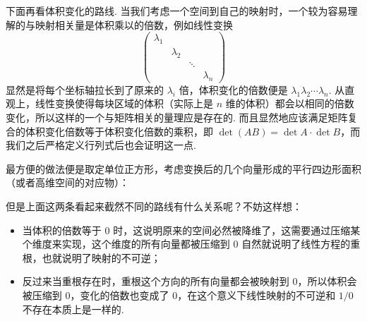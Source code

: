 下面再看体积变化的路线. 当我们考虑一个空间到自己的映射时，一个较为容易理解的与映射相关量是体积乘以的倍数，例如线性变换
$$
\begin{pmatrix}
\lambda_1 \\ & \lambda_2 \\ && \ddots \\ &&& \lambda_n
\end{pmatrix}
$$
显然是将每个坐标轴拉长到了原来的 $\lambda_i$ 倍，体积变化的倍数便是 $\lambda_1 \lambda_2 \cdots \lambda_n$. 从直观上，线性变换使得每块区域的体积（实际上是 $n$ 维的体积）都会以相同的倍数变化，所以这样的一个与矩阵相关的量理应是存在的. 而且显然地应该满足矩阵复合的体积变化倍数等于体积变化倍数的乘积，即 $\det(AB) = \det A \cdot \det B$，而我们之后严格定义行列式后也会证明这一点.

最方便的做法便是取定单位正方形，考虑变换后的几个向量形成的平行四边形面积（或者高维空间的对应物）：

\begin{figure}[htbp]
    \centering
\end{figure}

但是上面这两条看起来截然不同的路线有什么关系呢？不妨这样想：
\begin{itemize}
    \item 当体积的倍数等于 $0$ 时，这说明原来的空间必然被降维了，这需要通过压缩某个维度来实现，这个维度的所有向量都被压缩到 $0$ 自然就说明了线性方程的重根，也就说明了映射的不可逆；
    \item 反过来当重根存在时，重根这个方向的所有向量都会被映射到 $0$，所以体积会被压缩到 $0$，变化的倍数也变成了 $0$，在这个意义下线性映射的不可逆和 $1/0$ 不存在本质上是一样的.
\end{itemize}

